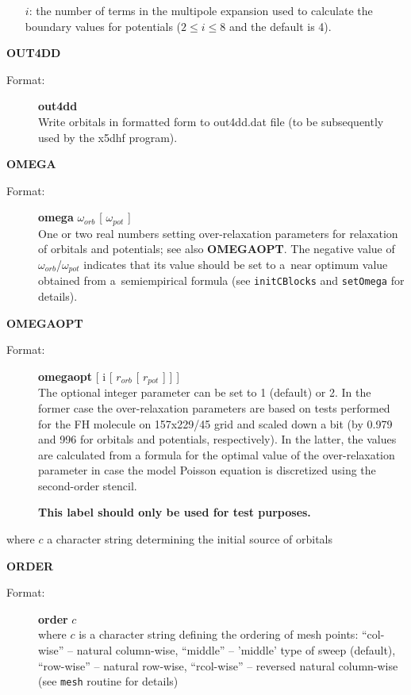 \documentclass[10pt,a4paper]{article}
\newcommand{\ft}[1]{\texttt{#1}}
\begin{document}
\begin{description}
\begin{description}
\begin{itemize}
\item[$i$:] the number of terms in the multipole expansion used to calculate
  the boundary values for potentials ($2 \le i\le 8$ and the default is 4).
\end{itemize}
\end{description}

\item \textbf{OUT4DD}
\begin{description}
\item[Format:] \textbf{out4dd}  \\ 
  Write orbitals in formatted form to out4dd.dat file (to be subsequently
  used by the x5dhf program).
\end{description}


\item \textbf{OMEGA}
\begin{description}
\item[Format:] \textbf{omega} $\omega_{orb}$ [ $\omega_{pot}$ ] \\ 
  One or two real numbers setting over-relaxation parameters for relaxation
  of orbitals and potentials; see also \textbf{OMEGAOPT}. The negative
  value of $\omega_{orb}$/$\omega_{pot}$ indicates that its value should be
  set to a~near optimum value obtained from a~semiempirical formula (see
  \ft{initCBlocks} and \ft{setOmega} for details).
\end{description}

\item \textbf{OMEGAOPT}
\begin{description}
\item[Format:] \textbf{omegaopt} [ i [ $r_{orb}$ [ $r_{pot}$ ] ] ] \\
  The optional integer parameter can be set to 1 (default) or 2. In the
  former case the over-relaxation parameters are based on tests performed
  for the FH molecule on 157x229/45 grid and scaled down a bit (by 0.979
  and 996 for orbitals and potentials, respectively). In the latter, the
  values are calculated from a formula for the optimal value of the
  over-relaxation parameter in case the model Poisson equation is
  discretized using the second-order stencil.

  \textbf{This label should only be used for test purposes.}
\end{description}

where $c$ a character string determining the initial source of orbitals

\item \textbf{ORDER}
\begin{description}
\item[Format:] \textbf{order} $c$\\
  where $c$ is a character string defining the ordering of mesh points:
  ``col-wise'' -- natural column-wise, ``middle'' -- 'middle' type of sweep
  (default), ``row-wise'' -- natural row-wise, ``rcol-wise'' -- reversed
  natural column-wise (see \ft{mesh} routine for details)
\end{description}


\end{description}
\end{document}
